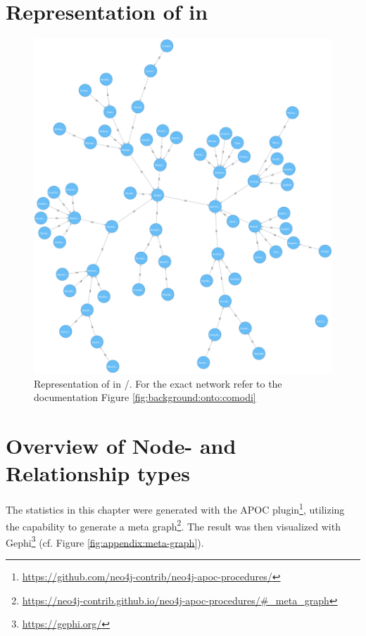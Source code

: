 \chapter{Representation of \comodi in \masymos}
\begin{figure}[H]
	\centering
	\includegraphics[width=\textwidth,height=0.5\textheight,keepaspectratio]{resources/neo4j-renders/comodi.pdf}
	\caption[Representation of \comodi in \masymos/\neoj]{Representation of \comodi in \masymos/\neoj. For the exact network refer to the documentation Figure \ref{fig:background:onto:comodi}}
	\label{fig:appendix:neo4j-comodi}
\end{figure}

\chapter{Overview of Node- and Relationship types}
\label{sec:appendix:meta-map}

\pagebreak
The statistics in this chapter were generated with the \neoj APOC plugin\footnote{\url{https://github.com/neo4j-contrib/neo4j-apoc-procedures/}}, utilizing the capability to generate a meta graph\footnote{\url{https://neo4j-contrib.github.io/neo4j-apoc-procedures/\#\_meta\_graph}}. The result was then visualized with Gephi\footnote{\url{https://gephi.org/}} (cf. Figure \ref{fig:appendix:meta-graph}).

